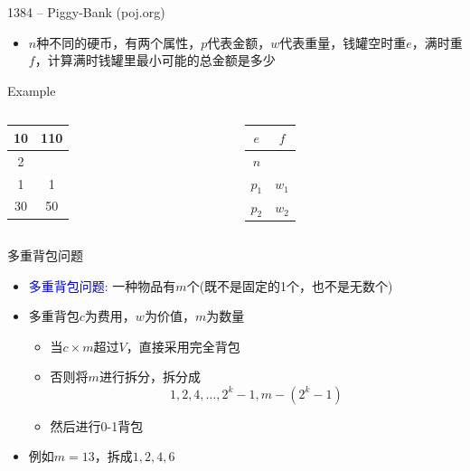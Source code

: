 \begin{frame}{1384 -- Piggy-Bank (poj.org)}
    \begin{itemize}
        \item $n$种不同的硬币，有两个属性，$p$代表金额，$w$代表重量，钱罐空时重$e$，满时重$f$，计算满时钱罐里最小可能的总金额是多少
    \end{itemize}
    \vfill
    \begin{exampleblock}{Example}
        \begin{columns}
            \begin{table}
                \begin{tabular}{cc}
                10 & 110 \\\hline
                2 &  \\\hline
                1 & 1 \\\hline
                \alert{30} & \alert{50} \\\hline
                \end{tabular}
            \end{table}
            \begin{table}
                \begin{tabular}{cc}
                $e$ & $f$ \\\hline
                $n$ \\\hline
                $p_1$ & $w_1$ \\\hline
                $p_2$ & $w_2$ \\\hline
                \end{tabular}
            \end{table}
        \end{columns}
    \end{exampleblock}
\end{frame}  
\begin{frame}{多重背包问题}
    \begin{itemize}
        \item \textcolor{blue}{多重背包问题}: 一种物品有$m$个(既不是固定的1个，也不是无数个)
        \vfill
        \item 多重背包$c$为费用，$w$为价值，$m$为数量
        \begin{itemize}                
            \item 当$c\times m$超过$V$，直接采用完全背包
            \item 否则将$m$进行拆分，拆分成$$1,2,4,…,2^k-1,𝑚−(2^k-1)$$
            \item 然后进行0-1背包
        \end{itemize}
        \vfill
        \item 例如$m=13$，拆成$1,2,4,6$
    \end{itemize}
\end{frame}       
